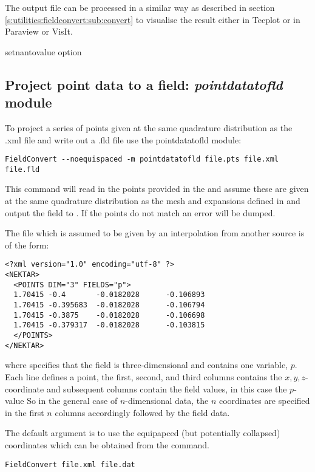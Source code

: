 The output file  can be processed in a similar 
way as described in section \ref{s:utilities:fieldconvert:sub:convert}
to visualise the result either in Tecplot or in Paraview or VisIt.

setnantovalue option
%
%
%

\subsection{ Project point data to a field: \textit{pointdatatofld} module}
\label{s:utilities:fieldconvert:sub:pointdatatofld}
To project a series of points given at the same quadrature distribution as the .xml file and write out a .fld file use the pointdatatofld module:
%
\begin{lstlisting}[style=BashInputStyle]
FieldConvert --noequispaced -m pointdatatofld file.pts file.xml file.fld
\end{lstlisting}
%
This command will read in the points provided in the 
and assume these are given at the same quadrature distribution as the
mesh and expansions defined in  and output the field
to . If the points do not match an error will be dumped. 


The file  which is assumed to be given by an interpolation from another source is of the form:
%
\begin{lstlisting}[style=XMLStyle]
<?xml version="1.0" encoding="utf-8" ?>
<NEKTAR>
  <POINTS DIM="3" FIELDS="p">
  1.70415 -0.4       -0.0182028      -0.106893
  1.70415 -0.395683  -0.0182028      -0.106794
  1.70415 -0.3875    -0.0182028      -0.106698
  1.70415 -0.379317  -0.0182028      -0.103815
  </POINTS>
</NEKTAR>
\end{lstlisting}
%
where  specifies that the field is
three-dimensional and contains one variable, $p$. Each line defines a
point, the first, second, and third columns contains the
$x,y,z$-coordinate and subsequent columns contain the field values, in
this case the $p$-value So in the general case of $n$-dimensional
data, the $n$ coordinates are specified in the first $n$ columns
accordingly followed by the field data. 

The default argument is to use the equipapced (but potentially
collapsed) coordinates which can  be obtained from the command.

\begin{lstlisting}[style=BashInputStyle]
FieldConvert file.xml file.dat
\end{lstlisting}

